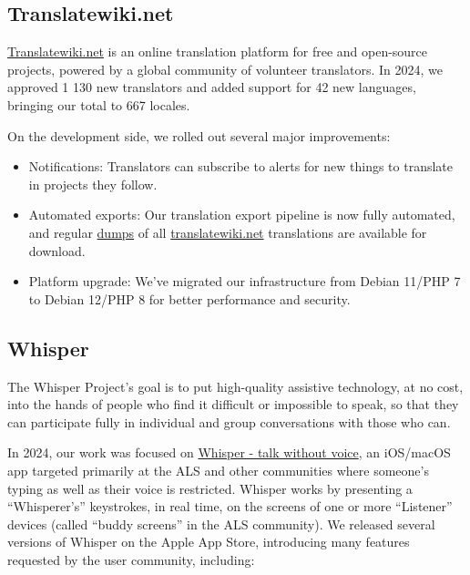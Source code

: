 \documentclass[a4paper]{report}
\begin{document}
\subsection{Translatewiki.net}

\href{https://translatewiki.net/}{Translatewiki.net} is an online translation platform for free and open-source projects, powered by a global community of volunteer translators. In 2024, we approved 1 130 new translators and added support for 42 new languages, bringing our total to 667 locales.

On the development side, we rolled out several major improvements:

\begin{itemize}

\item Notifications: Translators can subscribe to alerts for new things to translate in projects they follow.
\item Automated exports: Our translation export pipeline is now fully automated, and regular \href{https://translatewiki.net/wiki/Dumps}{dumps} of all \href{https://translatewiki.net/}{translatewiki.net} translations are available for download.
\item Platform upgrade: We’ve migrated our infrastructure from Debian 11/PHP 7 to Debian 12/PHP 8 for better performance and security.

\end{itemize}

\subsection{Whisper}

The Whisper Project’s goal is to put high-quality assistive technology, at no cost, into the hands of people who find it difficult or impossible to speak, so that they can participate fully in individual and group conversations with those who can.

In 2024, our work was focused on \href{https://apps.apple.com/us/app/whisper-talk-without-voice/id6446479064}{Whisper - talk without voice}, an iOS/macOS app targeted primarily at the ALS and other communities where someone’s typing as well as their voice is restricted. Whisper works by presenting a “Whisperer’s” keystrokes, in real time, on the screens of one or more “Listener” devices (called “buddy screens” in the ALS community). We released several versions of Whisper on the Apple App Store, introducing many features requested by the user community, including:
\end{document}
